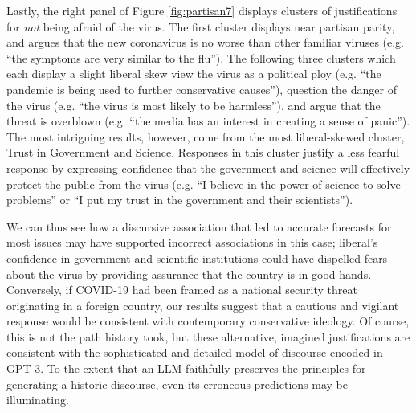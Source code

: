 \documentclass{article} %
\begin{document}
Lastly, the right panel of Figure \ref{fig:partisan7} displays clusters of justifications
for \emph{not} being afraid of the virus. The first cluster displays
near partisan parity, and argues that the new coronavirus is no worse
than other familiar viruses (e.g. ``the symptoms are very similar to the
flu''). The following three clusters which each display a slight liberal
skew view the virus as a political ploy (e.g. ``the pandemic is being
used to further conservative causes''), question the danger of the virus
(e.g. ``the virus is most likely to be harmless''), and argue that the
threat is overblown (e.g. ``the media has an interest in creating a
sense of panic''). The most intriguing results, however, come from the
most liberal-skewed cluster, Trust in Government and Science. Responses
in this cluster justify a less fearful response by expressing confidence
that the government and science will effectively protect the public from
the virus (e.g. ``I believe in the power of science to solve problems''
or ``I put my trust in the government and their scientists'').

We can thus see how a discursive association that led to accurate
forecasts for most issues may have supported incorrect associations in
this case; liberal's confidence in government and scientific
institutions could have dispelled fears about the virus by providing
assurance that the country is in good hands. Conversely, if COVID-19 had
been framed as a national security threat originating in a foreign
country, our results suggest that a cautious and vigilant response would
be consistent with contemporary conservative ideology. Of course, this
is not the path history took, but these alternative, imagined
justifications are consistent with the sophisticated and detailed model
of discourse encoded in GPT-3. To the extent that an LLM faithfully
preserves the principles for generating a historic discourse, even its
erroneous predictions may be illuminating.
\end{document}

